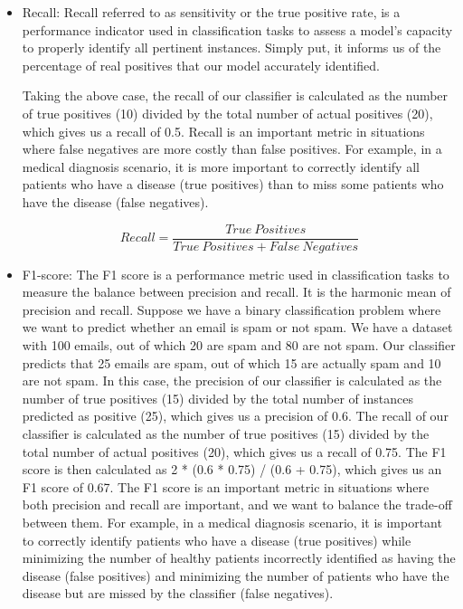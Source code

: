 \documentclass[12pt, a4paper, twoside]{report}
\theoremstyle{plain} %
\theoremstyle{definition} %
\theoremstyle{remark} %
\numberwithin{equation}{chapter}
\begin{document}
\begin{enumerate}
\begin{itemize}
\begin{equation}
\label{eq:Precision}
Precision = \frac{True:Positives}{True:Positives + False:Positives}
\end{equation}

\item Recall: Recall referred to as sensitivity or the true positive rate, is a performance indicator used in classification tasks to assess a model's capacity to properly identify all pertinent instances. Simply put, it informs us of the percentage of real positives that our model accurately identified.

Taking the above case, the recall of our classifier is calculated as the number of true positives (10) divided by the total number of actual positives (20), which gives us a recall of 0.5. Recall is an important metric in situations where false negatives are more costly than false positives. For example, in a medical diagnosis scenario, it is more important to correctly identify all patients who have a disease (true positives) than to miss some patients who have the disease (false negatives).



\begin{equation}
\label{eq:Recall}
Recall = \frac{True\ Positives}{True\ Positives + False\ Negatives}
\end{equation}

\item F1-score: 
The F1 score is a performance metric used in classification tasks to measure the balance between precision and recall. It is the harmonic mean of precision and recall. Suppose we have a binary classification problem where we want to predict whether an email is spam or not spam. 
We have a dataset with 100 emails, out of which 20 are spam and 80 are not spam. Our classifier predicts that 25 emails are spam, out of which 15 are actually spam and 10 are not spam. In this case, the precision of our classifier is calculated as the number of true positives (15) divided by the total number of instances predicted as positive (25), which gives us a precision of 0.6.  The recall of our classifier is calculated as the number of true positives (15) divided by the total number of actual positives (20), which gives us a recall of 0.75. The F1 score is then calculated as 2 * (0.6 * 0.75) / (0.6 + 0.75), which gives us an F1 score of 0.67.
The F1 score is an important metric in situations where both precision and recall are important, and we want to balance the trade-off between them. For example, in a medical diagnosis scenario, it is important to correctly identify patients who have a disease (true positives) while minimizing the number of healthy patients incorrectly identified as having the disease (false positives) and minimizing the number of patients who have the disease but are missed by the classifier (false negatives).


\end{itemize}
\end{enumerate}
\end{document}
